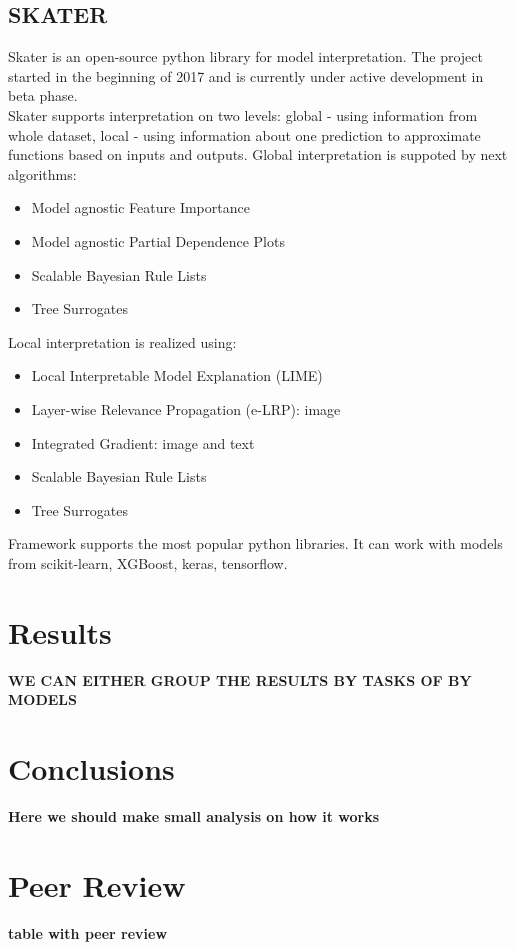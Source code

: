 \subsection{SKATER}
Skater is an open-source python library for model interpretation. The project started in the beginning of 2017 and is currently under active development in beta phase. \\
Skater supports interpretation on two levels: global - using information from whole dataset, local - using information about one prediction to approximate functions based on inputs and outputs. Global interpretation is suppoted by next algorithms:
\begin{itemize}
    \item Model agnostic Feature Importance
    \item Model agnostic Partial Dependence Plots
    \item Scalable Bayesian Rule Lists
    \item Tree Surrogates
\end{itemize}
Local interpretation is realized using:
\begin{itemize}
    \item Local Interpretable Model Explanation (LIME)
    \item Layer-wise Relevance Propagation (e-LRP): image
    \item Integrated Gradient: image and text
    \item Scalable Bayesian Rule Lists
    \item Tree Surrogates
\end{itemize}
Framework supports the most popular python libraries. It can work with models from scikit-learn, XGBoost, keras, tensorflow.

\section{Results}
\textbf{WE CAN EITHER GROUP THE RESULTS BY TASKS OF BY MODELS}

\section{Conclusions}
\textbf{Here we should make small analysis on how it works}

\section{Peer Review}
\textbf{table with peer review}

\newpage
\printbibliography
